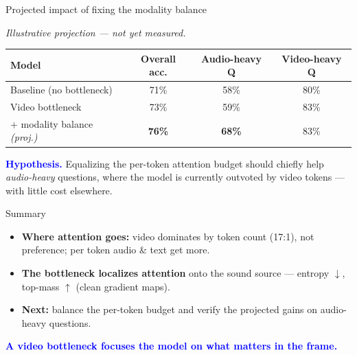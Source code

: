 \documentclass[aspectratio=169,11pt]{beamer}
\begin{document}
\begin{frame}{Projected impact of fixing the modality balance}
  \begin{center}\small\itshape Illustrative projection — not yet measured.\end{center}
  \begin{center}
  \renewcommand{\arraystretch}{1.4}
  \begin{tabular}{lccc}
    \toprule
    \textbf{Model} & \textbf{Overall acc.} & \textbf{Audio-heavy Q} & \textbf{Video-heavy Q} \\
    \midrule
    Baseline (no bottleneck)        & 71\% & 58\% & 80\% \\
    Video bottleneck                & 73\% & 59\% & 83\% \\
    \rowcolor{Soft}
    \;+ modality balance \emph{(proj.)} & \textbf{76\%} & \textbf{68\%} & 83\% \\
    \bottomrule
  \end{tabular}
  \end{center}
  \vfill
  \begin{beamercolorbox}[sep=5pt,rounded=true]{}\colorbox{Soft}{\parbox{\dimexpr\textwidth-12pt}{%
  \textcolor{Blue}{\textbf{Hypothesis.}} Equalizing the per-token attention
  budget should chiefly help \emph{audio-heavy} questions, where the model is
  currently outvoted by video tokens — with little cost elsewhere.}}\end{beamercolorbox}
\end{frame}

\begin{frame}{Summary}
  \begin{itemize}
    \item[\textcolor{Green}{\textbf{1}}] \textbf{Where attention goes:} video
      dominates by token count (17:1), not preference; per token audio \& text
      get more.
    \item[\textcolor{Green}{\textbf{2}}] \textbf{The bottleneck localizes
      attention} onto the sound source — entropy $\downarrow$, top-mass
      $\uparrow$ (clean gradient maps).
    \item[\textcolor{Green}{\textbf{3}}] \textbf{Next:} balance the per-token
      budget and verify the projected gains on audio-heavy questions.
  \end{itemize}
  \vfill
  \begin{center}\Large\textcolor{Blue}{\textbf{A video bottleneck focuses the
  model on what matters in the frame.}}\end{center}
\end{frame}
\end{document}
